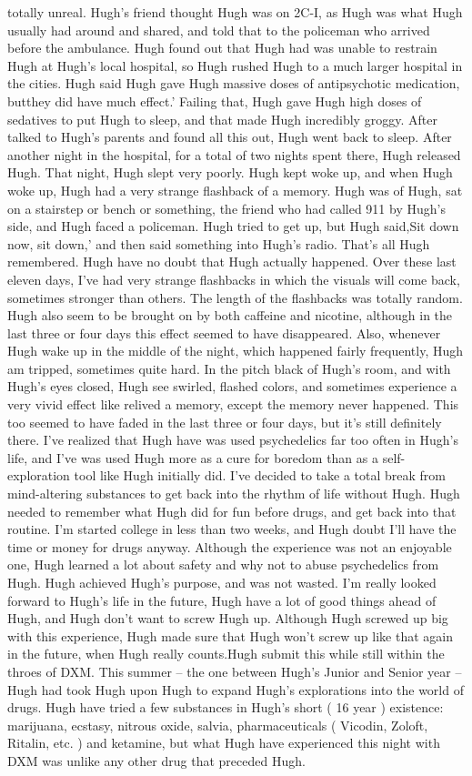 \documentclass[12pt]{book}
\begin{document}
totally unreal. Hugh's friend thought Hugh was on 2C-I, as Hugh was what Hugh usually had around and shared, and told that to the policeman who arrived before the ambulance. Hugh found out that Hugh had was unable to restrain Hugh at Hugh's local hospital, so Hugh rushed Hugh to a much larger hospital in the cities. Hugh said Hugh gave Hugh massive doses of antipsychotic medication, butthey did have much effect.' Failing that, Hugh gave Hugh high doses of sedatives to put Hugh to sleep, and that made Hugh incredibly groggy. After talked to Hugh's parents and found all this out, Hugh went back to sleep. After another night in the hospital, for a total of two nights spent there, Hugh released Hugh. That night, Hugh slept very poorly. Hugh kept woke up, and when Hugh woke up, Hugh had a very strange flashback of a memory. Hugh was of Hugh, sat on a stairstep or bench or something, the friend who had called 911 by Hugh's side, and Hugh faced a policeman. Hugh tried to get up, but Hugh said,Sit down now, sit down,' and then said something into Hugh's radio. That's all Hugh remembered. Hugh have no doubt that Hugh actually happened. Over these last eleven days, I've had very strange flashbacks in which the visuals will come back, sometimes stronger than others. The length of the flashbacks was totally random. Hugh also seem to be brought on by both caffeine and nicotine, although in the last three or four days this effect seemed to have disappeared. Also, whenever Hugh wake up in the middle of the night, which happened fairly frequently, Hugh am tripped, sometimes quite hard. In the pitch black of Hugh's room, and with Hugh's eyes closed, Hugh see swirled, flashed colors, and sometimes experience a very vivid effect like relived a memory, except the memory never happened. This too seemed to have faded in the last three or four days, but it's still definitely there. I've realized that Hugh have was used psychedelics far too often in Hugh's life, and I've was used Hugh more as a cure for boredom than as a self-exploration tool like Hugh initially did. I've decided to take a total break from mind-altering substances to get back into the rhythm of life without Hugh. Hugh needed to remember what Hugh did for fun before drugs, and get back into that routine. I'm started college in less than two weeks, and Hugh doubt I'll have the time or money for drugs anyway. Although the experience was not an enjoyable one, Hugh learned a lot about safety and why not to abuse psychedelics from Hugh. Hugh achieved Hugh's purpose, and was not wasted. I'm really looked forward to Hugh's life in the future, Hugh have a lot of good things ahead of Hugh, and Hugh don't want to screw Hugh up. Although Hugh screwed up big with this experience, Hugh made sure that Hugh won't screw up like that again in the future, when Hugh really counts.Hugh submit this while still within the throes of DXM. This summer -- the one between Hugh's Junior and Senior year -- Hugh had took Hugh upon Hugh to expand Hugh's explorations into the world of drugs. Hugh have tried a few substances in Hugh's short ( 16 year ) existence: marijuana, ecstasy, nitrous oxide, salvia, pharmaceuticals ( Vicodin, Zoloft, Ritalin, etc. ) and ketamine, but what Hugh have experienced this night with DXM was unlike any other drug that preceded Hugh. 
\end{document}
